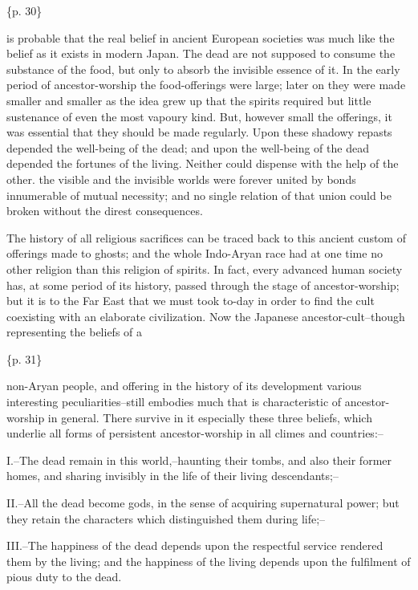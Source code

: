 \{p. 30\}

is probable that the real belief in ancient European societies was much like the belief as it exists in modern Japan. The dead are not supposed to consume the substance of the food, but only to absorb the invisible essence of it. In the early period of ancestor-worship the food-offerings were large; later on they were made smaller and smaller as the idea grew up that the spirits required but little sustenance of even the most vapoury kind. But, however small the offerings, it was essential that they should be made regularly. Upon these shadowy repasts depended the well-being of the dead; and upon the well-being of the dead depended the fortunes of the living. Neither could dispense with the help of the other. the visible and the invisible worlds were forever united by bonds innumerable of mutual necessity; and no single relation of that union could be broken without the direst consequences.

The history of all religious sacrifices can be traced back to this ancient custom of offerings made to ghosts; and the whole Indo-Aryan race had at one time no other religion than this religion of spirits. In fact, every advanced human society has, at some period of its history, passed through the stage of ancestor-worship; but it is to the Far East that we must took to-day in order to find the cult coexisting with an elaborate civilization. Now the Japanese ancestor-cult--though representing the beliefs of a

\{p. 31\}

non-Aryan people, and offering in the history of its development various interesting peculiarities--still embodies much that is characteristic of ancestor-worship in general. There survive in it especially these three beliefs, which underlie all forms of persistent ancestor-worship in all climes and countries:--

I.--The dead remain in this world,--haunting their tombs, and also their former homes, and sharing invisibly in the life of their living descendants;--

II.--All the dead become gods, in the sense of acquiring supernatural power; but they retain the characters which distinguished them during life;--

III.--The happiness of the dead depends upon the respectful service rendered them by the living; and the happiness of the living depends upon the fulfilment of pious duty to the dead.




